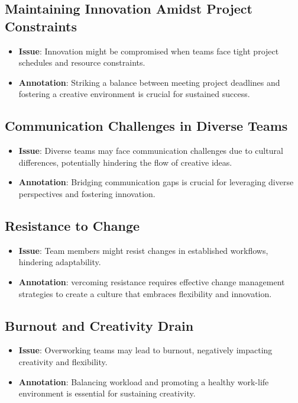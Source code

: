 \documentclass[a4paper, twoside]{article}
\begin{document}
\subsection{Maintaining Innovation Amidst Project Constraints}
\begin{itemize}
  \item \textbf{Issue}:  Innovation might be compromised when teams face tight project schedules and resource constraints.
  \item \textbf{Annotation}: Striking a balance between meeting project deadlines and fostering a creative environment is crucial for sustained success.\cite{Amabile2011}
\end{itemize}

\subsection{Communication Challenges in Diverse Teams}
\begin{itemize}
  \item \textbf{Issue}: Diverse teams may face communication challenges due to cultural differences, potentially hindering the flow of creative ideas.
  \item \textbf{Annotation}: Bridging communication gaps is crucial for leveraging diverse perspectives and fostering innovation.\cite{Cox1994}
\end{itemize}

\subsection{Resistance to Change}
\begin{itemize}
  \item \textbf{Issue}:  Team members might resist changes in established workflows, hindering adaptability.
  \item \textbf{Annotation}: vercoming resistance requires effective change management strategies to create a culture that embraces flexibility and innovation.\cite{Kotter1996}
\end{itemize}

\subsection{Burnout and Creativity Drain}
\begin{itemize}
  \item \textbf{Issue}:  Overworking teams may lead to burnout, negatively impacting creativity and flexibility.
  \item \textbf{Annotation}: Balancing workload and promoting a healthy work-life environment is essential for sustaining creativity.\cite{Amabile2011}
\end{itemize}
\end{document}
